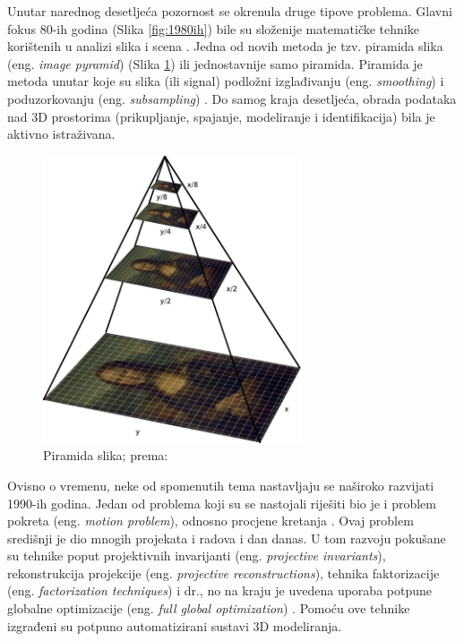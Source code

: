 \documentclass[]{foi} %
\begin{document}
Unutar narednog desetljeća pozornost se okrenula druge tipove problema. Glavni fokus 80-ih godina (Slika \ref{fig:1980ih}) bile su složenije matematičke tehnike korištenih u analizi slika i scena \cite[str. 15]{szeliskicvaa}. Jedna od novih metoda je tzv. piramida slika (eng. \textit{image pyramid}) (Slika \ref{fig:piramidaSlika}) ili jednostavnije samo piramida. Piramida je metoda unutar koje su slika (ili signal) podložni izglađivanju (eng. \textit{smoothing}) i poduzorkovanju (eng. \textit{subsampling}) \cite{wikipediaPiramida}. Do samog kraja desetljeća, obrada podataka nad 3D prostorima (prikupljanje, spajanje, modeliranje i identifikacija) bila je aktivno istraživana.

\begin{figure}[!hb]
    \centering
    \includegraphics[width=0.68\textwidth]{slike/piramidaslika.png}
    \caption{Piramida slika; prema: \cite{szeliskicvaa}}
    \label{fig:piramidaSlika}
\end{figure}

Ovisno o vremenu, neke od spomenutih tema nastavljaju se naširoko razvijati 1990-ih godina. Jedan od problema koji su se nastojali riješiti bio je i problem pokreta (eng. \textit{motion problem}), odnosno procjene kretanja \cite[str. 15]{szeliskicvaa}. Ovaj problem središnji je dio mnogih projekata i radova i dan danas. U tom razvoju pokušane su tehnike poput projektivnih invarijanti (eng. \textit{projective invariants}), rekonstrukcija projekcije (eng. \textit{projective reconstructions}), tehnika faktorizacije (eng. \textit{factorization techniques}) i dr., no na kraju je uvedena uporaba potpune globalne optimizacije (eng. \textit{full global optimization}) \cite[str. 15-18]{szeliskicvaa}. Pomoću ove tehnike izgrađeni su potpuno automatizirani sustavi 3D modeliranja.
\end{document}
